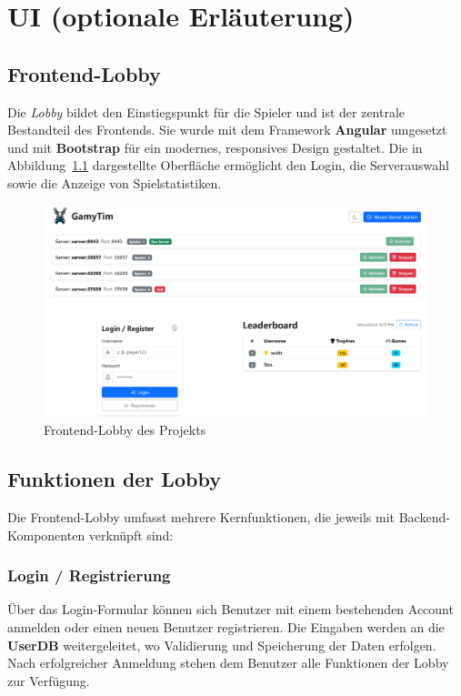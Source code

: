 \chapter{UI (optionale Erläuterung)}
\section{Frontend-Lobby}
\label{chap:frontend}

Die \textit{Lobby} bildet den Einstiegspunkt für die Spieler und ist der zentrale Bestandteil des Frontends. 
Sie wurde mit dem Framework \textbf{Angular} umgesetzt und mit \textbf{Bootstrap} für ein modernes, responsives Design gestaltet. 
Die in Abbildung~\ref{fig:frontend_lobby} dargestellte Oberfläche ermöglicht den Login, die Serverauswahl sowie die Anzeige von Spielstatistiken.

\begin{figure}[h!]
  \centering
  \includegraphics[width=1\linewidth]{../images/LobbyW.png}
  \caption{Frontend-Lobby des Projekts}
  \label{fig:frontend_lobby}
\end{figure}

\section{Funktionen der Lobby}
Die Frontend-Lobby umfasst mehrere Kernfunktionen, die jeweils mit Backend-Komponenten verknüpft sind:

\subsection{Login / Registrierung}
Über das Login-Formular können sich Benutzer mit einem bestehenden Account anmelden oder einen neuen Benutzer registrieren.  
Die Eingaben werden an die \textbf{UserDB} weitergeleitet, wo Validierung und Speicherung der Daten erfolgen.  
Nach erfolgreicher Anmeldung stehen dem Benutzer alle Funktionen der Lobby zur Verfügung.
